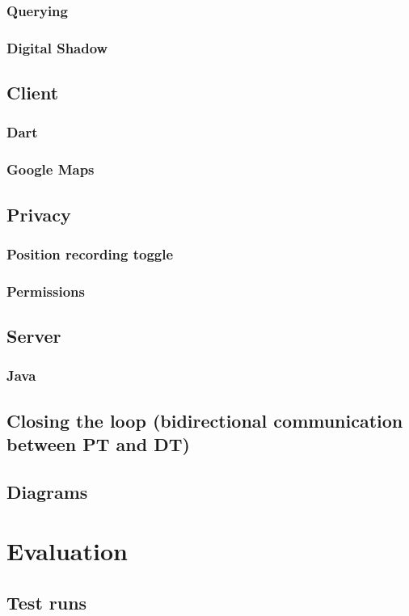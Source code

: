 \documentclass{article}
\begin{document}
\subsubsection{Querying}
\subsubsection{Digital Shadow}
\subsection{Client}
\subsubsection{Dart}
\subsubsection{Google Maps}
\subsection{Privacy}
\subsubsection{Position recording toggle}
\subsubsection{Permissions}
\subsection{Server}
\subsubsection{Java}
\subsection{Closing the loop (bidirectional communication between PT and DT)}
\subsection{Diagrams}



\newpage
\section{Evaluation}\label{sec:Evaluation}
\subsection{Test runs}
\end{document}
